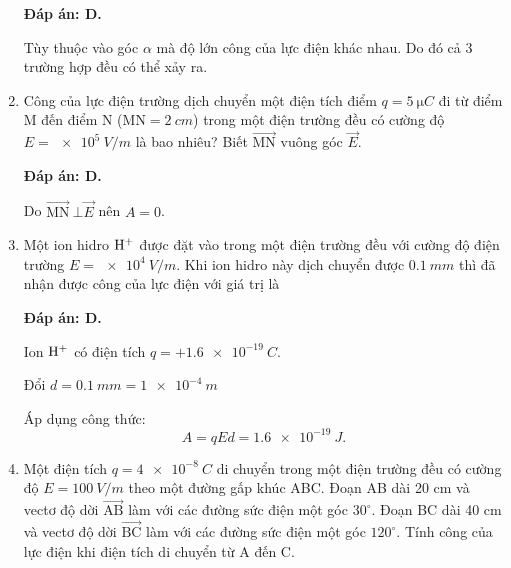 \begin{enumerate}[label=\bfseries Câu \arabic*:]
{	}
	\loigiai
	{	\textbf{Đáp án: D.}
		
		Tùy thuộc vào góc $\alpha$ mà độ lớn công của lực điện khác nhau. Do đó cả 3 trường hợp đều có thể xảy ra.
	}
	\item {}
	
	\cauhoi
	{Công của lực điện trường dịch chuyển một điện tích điểm $q=\SI{5}{\micro C}$ đi từ điểm M đến điểm N ($\text{MN} = \SI{2}{cm}$) trong một điện trường đều có cường độ $E=\SI{e5}{V/m}$ là bao nhiêu? Biết $\overrightarrow{\text{MN}}$ vuông góc $\vec E$.
		
	}
	\loigiai
	{	\textbf{Đáp án: D.}
		
		Do $\overrightarrow{\text{MN}}\ \bot \vec{E}$ nên $A=0$.
	}
	\item {}

	\cauhoi
	{Một ion hidro $\ce{H}^+$ được đặt vào trong một điện trường đều với cường độ điện trường $E=\SI{e4}{V/m}$. Khi ion hidro này dịch chuyển được $\SI{0.1}{mm}$ thì đã nhận được công của lực điện với giá trị là
		
	}
	\loigiai
	{	\textbf{Đáp án: D.}
		
		Ion $\ce{H}^+$ có điện tích $q=+\SI{1.6e-19}{C}$.
		
		Đổi $d=\SI{0.1}{mm}=\SI{1e-4}{m}$
		
		Áp dụng công thức:
		$$A=qEd = \SI{1.6e-19}{J}.$$
	}
	\item {}
	
	\cauhoi
	{Một điện tích $q=\SI{4e-8}{C}$ di chuyển trong một điện trường đều có cường độ $E=\SI{100}{V/m}$ theo một đường gấp khúc ABC. Đoạn AB dài 20 cm và vectơ độ dời $\overrightarrow{\text{AB}}$ làm với các đường sức điện một góc $30^\circ$. Đoạn BC dài 40 cm và vectơ độ dời $\overrightarrow{\text{BC}}$ làm với các đường sức điện một góc $120^\circ$. Tính công của lực điện khi điện tích di chuyển từ A đến C.
		
}
\end{enumerate}
